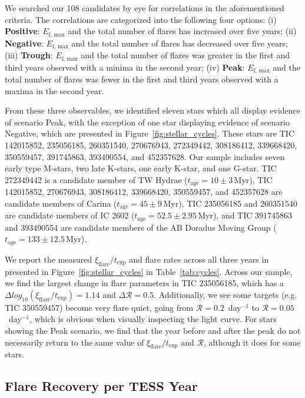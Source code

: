 \documentclass[twocolumn, linenumbers]{aastex631}
\begin{document}
We searched our 108 candidates by eye for correlations in the aforementioned criteria. The correlations are categorized into the following four options: (i) \textbf{Positive}:  $E_\textrm{f, max}$
and the total number of flares has increased over five years; (ii) \textbf{Negative}:  $E_\textrm{f, max}$ and the total number of flares has decreased over five years; (iii) \textbf{Trough}:
$E_\textrm{f, max}$ and the total number of flares was greater in the first and third years observed with a minima in the second year; (iv) \textbf{Peak}:  $E_\textrm{f, max}$ and the total number
of flares was fewer in the first and third years observed with a maxima in the second year.

From these three observables, we identified eleven stars which all display evidence of scenario Peak, with the exception of one star displaying evidence of scenario Negative, which are presented in
Figure~\ref{fig:stellar_cycles}. These stars are TIC
142015852, 235056185, 260351540, 270676943, 272349442, 308186412, 339668420, 350559457, 391745863, 393490554, and 452357628.  Our sample includes seven early type M-stars, two late K-stars, one
early K-star, and one G-star. TIC 272349442 is a candidate member of TW Hydrae ($t_\textrm{age} = 10 \pm 3$\,Myr), TIC 142015852, 270676943, 308186412, 339668420, 350559457, and 452357628 are
candidate members of Carina ($t_\textrm{age} = 45 \pm 9$\,Myr), TIC 235056185 and  260351540 are candidate members of IC 2602 ($t_\textrm{age} = 52.5 \pm 2.95$\,Myr), and TIC 391745863 and 393490554
are candidate members of the AB Doradus Moving Group ($t_\textrm{age} = 133 \pm 12.5$\,Myr).

We report the measured $\xi_\textrm{flare}/t_\textrm{exp}$ and flare rates across all three years in presented in Figure~\ref{fig:stellar_cycles} in Table~\ref{tab:cycles}. Across our sample, we
find the largest change in flare parameters in TIC 235056185, which has a $\Delta log_{10}(\xi_\textrm{flare} / t_\textrm{exp}) = 1.14$ and $\Delta \mathcal{R} = 0.5$. Additionally, we see some
targets (e.g. TIC 350559457) become very flare quiet, going from $\mathcal{R} = 0.2$~day$^{-1}$ to $\mathcal{R} = 0.05$~day$^{-1}$, which is obvious when visually inspecting the light curve. For
stars showing the Peak scenario, we find that the year before and after the peak do not necessarily return to the same value of $\xi_\textrm{flare} / t_\textrm{exp}$ and $\mathcal{R}$, although it
does for some stars.


\subsection{Flare Recovery per TESS Year}\label{subsec:inj-rec}
\end{document}
